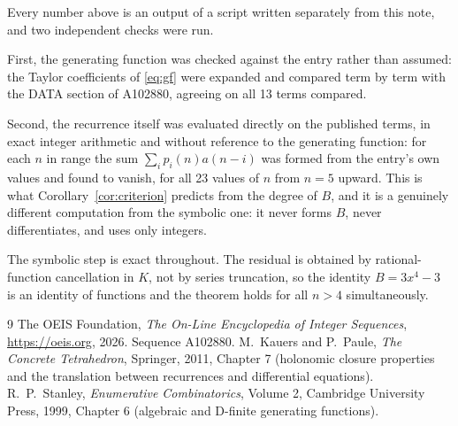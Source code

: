 \documentclass[11pt,a4paper]{article}
\theoremstyle{plain}
\theoremstyle{definition}
\begin{document}
Every number above is an output of a script written separately from this note, and two
independent checks were run.

First, the generating function was checked against the entry rather than assumed: the
Taylor coefficients of \eqref{eq:gf} were expanded and compared term by term with the DATA
section of A102880, agreeing on all 13 terms compared.

Second, the recurrence itself was evaluated directly on the published terms, in exact
integer arithmetic and without reference to the generating function: for each $n$ in range
the sum $\sum_{i}p_{i}(n)a(n-i)$ was formed from the entry's own values and found to
vanish, for all 23 values of $n$ from $n=5$ upward. This is what
Corollary~\ref{cor:criterion} predicts from the degree of $B$, and it is a genuinely
different computation from the symbolic one: it never forms $B$, never differentiates, and
uses only integers.

The symbolic step is exact throughout. The residual is obtained by rational-function
cancellation in $K$, not by series truncation, so the identity $B=3 x^{4} - 3$ is an
identity of functions and the theorem holds for all $n>4$ simultaneously.

\begin{thebibliography}{9}
 The OEIS Foundation, \emph{The On-Line Encyclopedia of Integer Sequences},
\url{https://oeis.org}, 2026. Sequence A102880.
 M.~Kauers and P.~Paule, \emph{The Concrete Tetrahedron}, Springer, 2011,
Chapter 7 (holonomic closure properties and the translation between recurrences and
differential equations).
 R.~P.~Stanley, \emph{Enumerative Combinatorics}, Volume 2, Cambridge
University Press, 1999, Chapter 6 (algebraic and D-finite generating functions).
\end{thebibliography}
\end{document}
